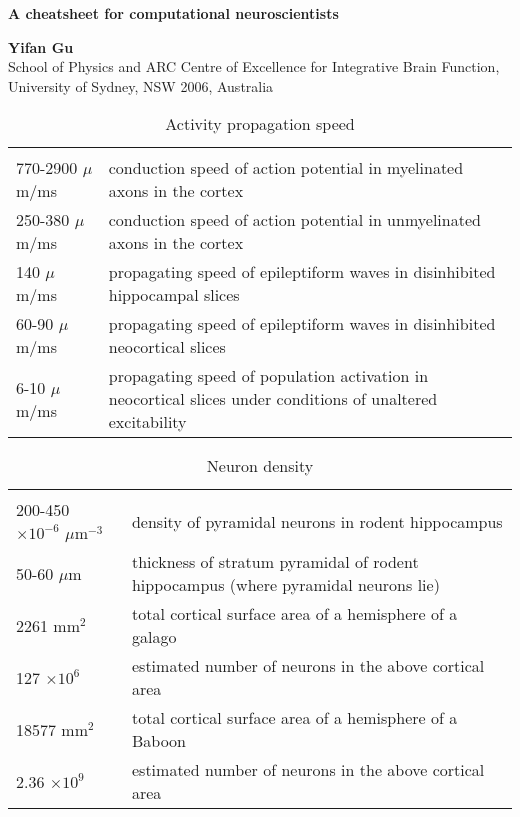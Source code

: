 \documentclass[a4paper, 10pt]{article}
\begin{document}
{\centering\doublespacing
\Large{\textbf{A cheatsheet for computational neuroscientists}} 

\normalsize{\textbf{Yifan Gu} \\
\small{{School of Physics and ARC Centre of Excellence for Integrative Brain Function, \\
University of Sydney, NSW 2006, Australia} }	
\date{\today} 
\par
}
}


\begin{table}[h]
\captionsetup{font=small}
\footnotesize
\centering
\begin{tabular}[c]{p{3cm}p{6cm}}
\hline \\
770-2900 $\mu$m/ms &  conduction speed of action potential in myelinated axons in the cortex  \cite{debanne2011axon} \\
250-380 $\mu$m/ms & conduction speed of action potential in unmyelinated axons in the cortex  \cite{debanne2011axon} \\
140 $\mu$m/ms &  propagating speed of epileptiform waves in disinhibited hippocampal slices  \cite{miles1988spread} \\
60-90 $\mu$m/ms &  propagating speed of epileptiform waves in disinhibited neocortical slices  \cite{pinto2005initiation, chervin1988periodicity} \\
6-10 $\mu$m/ms & propagating speed of population activation in neocortical slices under conditions of
unaltered excitability   \cite{wu1999propagating} \\
\hline
\end{tabular}
\caption{Activity propagation speed}
\end{table}


\begin{table}[h]
\captionsetup{font=small}
\footnotesize
\centering
\begin{tabular}[c]{p{3cm}p{6cm}}
\hline \\
200-450 $\times 10^{-6}$  $\mu$m$^{-3}$ & density of pyramidal neurons in rodent hippocampus \cite{jinno2010stereological} \\
50-60  $\mu$m & thickness of stratum pyramidal of rodent hippocampus (where pyramidal neurons lie) \cite{ghafari2014prenatal} \\
2261 mm$^2$ & total cortical surface area of a hemisphere of a galago \citep{collins2010neuron} \\
127 $\times 10^{6}$ & estimated number of neurons in the above cortical area \citep{collins2010neuron} \\
18577 mm$^2$ & total cortical surface area of a hemisphere of a Baboon \citep{collins2010neuron} \\
2.36 $\times 10^{9}$ & estimated number of neurons in the above cortical area \citep{collins2010neuron} \\
\hline
\end{tabular}
\caption{Neuron density}
\end{table}




\end{document}
